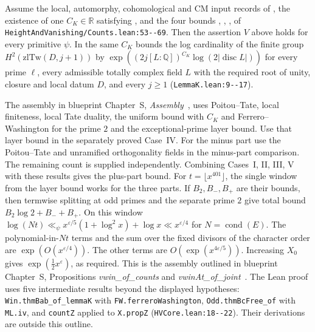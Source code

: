 \begin{formalstatement}\label{pn:P020}
Assume the local, automorphy, cohomological and CM input records of , the existence of one $C_K\in\mathbb R$ satisfying , and the four bounds , , ,  of \nolinkurl{HeightAndVanishing/Counts.lean:53--69}. Then the assertion $V$ above holds for every primitive $\psi$. In  the same $C_K$ bounds the log cardinality of the finite group $H^2(\mathrm{zlTw}(D,j+1))$ by $\exp((2j[L:\mathbb Q])^{C_K}\log(2|\operatorname{disc}L|))$ for every prime $\ell$, every admissible totally complex field $L$ with the required root of unity, closure and local datum $D$, and every $j\ge1$ (\nolinkurl{LemmaK.lean:9--17}).
\end{formalstatement}
\begin{outline}
The assembly in blueprint Chapter~S, \emph{Assembly}~, uses Poitou--Tate, local finiteness, local Tate duality, the uniform bound with $C_K$ and Ferrero--Washington for the prime $2$ and the exceptional-prime layer bound. Use that layer bound in the separately proved Case~IV. For the minus part use the Poitou--Tate and unramified orthogonality fields in the minus-part comparison. The remaining count  is supplied independently. Combining Cases~I, II, III, V with these results gives the plus-part bound. For $t=\lfloor x^{401}\rfloor$, the single window from the layer bound works for the three parts. If $B_2,B_-,B_+$ are their bounds, then termwise splitting at odd primes and the separate prime $2$ give total bound $B_2\log 2+B_-+B_+$. On this window $\log(Nt)\ll_{\psi} x^{\varepsilon/5}(1+\log^2x)+\log x\ll x^{\varepsilon/4}$ for $N=\operatorname{cond}(E)$. The polynomial-in-$Nt$ terms and the sum over the fixed divisors of the character order are $\exp(O(x^{\varepsilon/4}))$. The other terms are $O(\exp(x^{4\varepsilon/5}))$. Increasing $X_0$ gives $\exp(\tfrac12 x^\varepsilon)$, as required. This is the assembly outlined in blueprint Chapter~S, Propositions \emph{vwin\_of\_counts} and \emph{vwinAt\_of\_joint}~. The Lean proof uses five intermediate results beyond the displayed hypotheses: \nolinkurl{Win.thmBab_of_lemmaK} with \nolinkurl{FW.ferreroWashington}, \nolinkurl{Odd.thmBcFree_of} with \nolinkurl{ML.iv}, and \nolinkurl{countZ} applied to \nolinkurl{X.propZ} (\nolinkurl{HVCore.lean:18--22}). Their derivations are outside this outline.
\end{outline}
